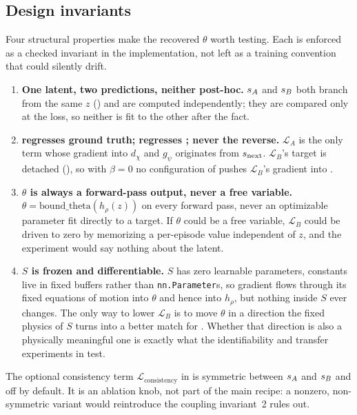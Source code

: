 \subsection{Design invariants}
\label{sec:method-invariants}

Four structural properties make the recovered $\theta$ worth testing.
Each is enforced as a checked invariant in the implementation, not
left as a training convention that could silently drift.

\begin{enumerate}[leftmargin=1.6em, itemsep=2pt]
  \item \textbf{One latent, two predictions, neither post-hoc.}
    $s_A$ and $s_B$ both branch from the same $z$
    () and are computed independently; they
    are compared only at the loss, so neither is fit to the other
    after the fact.
  \item \textbf{\pathA regresses ground truth; \pathB regresses
    \pathA; never the reverse.} $\mathcal L_A$ is the only term whose
    gradient into $d_\chi$ and $g_\psi$ originates from $s_{\mathrm{next}}$.
    $\mathcal L_B$'s target is detached (), so
    with $\beta=0$ no configuration of  pushes
    $\mathcal L_B$'s gradient into \pathA.
  \item \textbf{$\theta$ is always a forward-pass output, never a free
    variable.} $\theta = \mathrm{bound\_theta}(h_\rho(z))$ on every
    forward pass, never an optimizable parameter fit directly to a
    target. If $\theta$ could be a free variable, $\mathcal L_B$ could
    be driven to zero by memorizing a per-episode value independent of
    $z$, and the experiment would say nothing about the latent.
  \item \textbf{$S$ is frozen and differentiable.} $S$ has zero
    learnable parameters, constants live in fixed buffers rather than
    \texttt{nn.Parameter}s, so gradient flows through its fixed
    equations of motion into $\theta$ and hence into $h_\rho$, but
    nothing inside $S$ ever changes. The only way to lower
    $\mathcal L_B$ is to move $\theta$ in a direction the fixed physics
    of $S$ turns into a better match for \pathA. Whether that direction
    is also a physically meaningful one is exactly what the
    identifiability and transfer experiments in
     test.
\end{enumerate}

The optional consistency term $\mathcal L_{\mathrm{consistency}}$ in
 is symmetric between $s_A$ and $s_B$ and off by
default. It is an ablation knob, not part of the main recipe: a
nonzero, non-symmetric variant would reintroduce the coupling
invariant~2 rules out.
